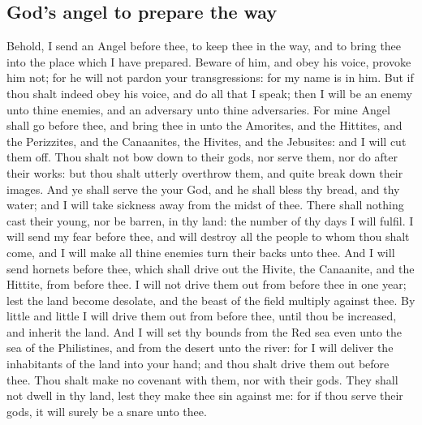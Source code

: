 \begin{biblechapter}
\section*{God's angel to prepare the way}
\verse Behold, I send an Angel before thee, to keep thee in the way, and to bring thee into the place which I have prepared.
\verse Beware of him, and obey his voice, provoke him not; for he will not pardon your transgressions: for my name is in him.
\verse But if thou shalt indeed obey his voice, and do all that I speak; then I will be an enemy unto thine enemies, and an adversary unto thine adversaries.
\verse For mine Angel shall go before thee, and bring thee in unto the Amorites, and the Hittites, and the Perizzites, and the Canaanites, the Hivites, and the Jebusites: and I will cut them off.
\verse Thou shalt not bow down to their gods, nor serve them, nor do after their works: but thou shalt utterly overthrow them, and quite break down their images.
\verse And ye shall serve the \LORD your God, and he shall bless thy bread, and thy water; and I will take sickness away from the midst of thee.
\verse There shall nothing cast their young, nor be barren, in thy land: the number of thy days I will fulfil.
\verse I will send my fear before thee, and will destroy all the people to whom thou shalt come, and I will make all thine enemies turn their backs unto thee.
\verse And I will send hornets before thee, which shall drive out the Hivite, the Canaanite, and the Hittite, from before thee.
\verse I will not drive them out from before thee in one year; lest the land become desolate, and the beast of the field multiply against thee.
\verse By little and little I will drive them out from before thee, until thou be increased, and inherit the land.
\verse And I will set thy bounds from the Red sea even unto the sea of the Philistines, and from the desert unto the river: for I will deliver the inhabitants of the land into your hand; and thou shalt drive them out before thee.
\verse Thou shalt make no covenant with them, nor with their gods.
\verse They shall not dwell in thy land, lest they make thee sin against me: for if thou serve their gods, it will surely be a snare unto thee.
\end{biblechapter}

